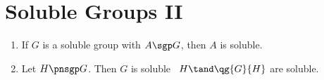 \documentclass[a4paper]{article}
\begin{document}
\section{Soluble Groups II}

\begin{ttheorem}
  \begin{enumerate}
    \item If \( G \) is a soluble group with \( A\sgp G \), then \( A \) is soluble.
    \item Let \( H\pnsgp G \). Then \( G \) is soluble \iff~\( H\tand \qg{G}{H} \) are soluble.
  \end{enumerate}
\end{ttheorem}
\end{document}

